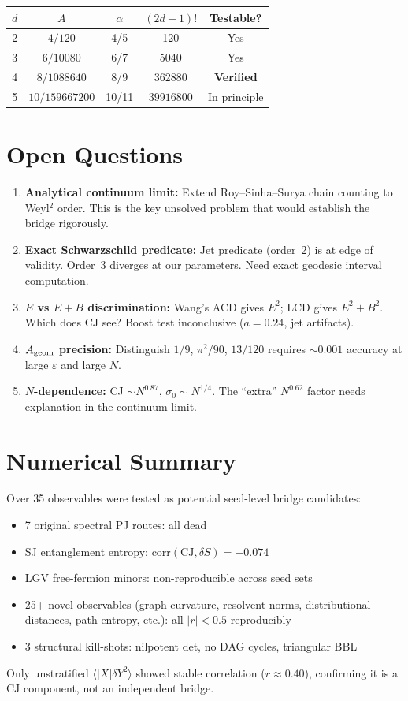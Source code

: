 \documentclass[11pt,a4paper]{article}
\begin{document}
\begin{center}
\begin{tabular}{ccccc}
\toprule
$d$ & $A$ & $\alpha$ & $(2d+1)!$ & Testable? \\
\midrule
2 & $4/120$ & 4/5 & 120 & Yes \\
3 & $6/10080$ & 6/7 & 5040 & Yes \\
4 & $8/1088640$ & 8/9 & 362880 & \textbf{Verified} \\
5 & $10/159667200$ & 10/11 & $39916800$ & In principle \\
\bottomrule
\end{tabular}
\end{center}

\section{Open Questions}

\begin{enumerate}
\item \textbf{Analytical continuum limit:} Extend Roy--Sinha--Surya chain counting to Weyl$^2$ order. This is the key unsolved problem that would establish the bridge rigorously.
\item \textbf{Exact Schwarzschild predicate:} Jet predicate (order~2) is at edge of validity. Order~3 diverges at our parameters. Need exact geodesic interval computation.
\item \textbf{$E$ vs $E+B$ discrimination:} Wang's ACD gives $E^2$; LCD gives $E^2+B^2$. Which does CJ see? Boost test inconclusive ($a = 0.24$, jet artifacts).
\item \textbf{$A_{\rm geom}$ precision:} Distinguish $1/9$, $\pi^2/90$, $13/120$ requires $\sim 0.001$ accuracy at large $\varepsilon$ and large $N$.
\item \textbf{$N$-dependence:} CJ $\sim N^{0.87}$, $\sigma_0 \sim N^{1/4}$. The ``extra'' $N^{0.62}$ factor needs explanation in the continuum limit.
\end{enumerate}

\section{Numerical Summary}

Over 35 observables were tested as potential seed-level bridge candidates:
\begin{itemize}
\item 7 original spectral PJ routes: all dead
\item SJ entanglement entropy: $\text{corr}(\text{CJ}, \delta S) = -0.074$
\item LGV free-fermion minors: non-reproducible across seed sets
\item 25+ novel observables (graph curvature, resolvent norms, distributional distances, path entropy, etc.): all $|r| < 0.5$ reproducibly
\item 3 structural kill-shots: nilpotent det, no DAG cycles, triangular BBL
\end{itemize}

Only unstratified $\langle|X|\delta Y^2\rangle$ showed stable correlation ($r \approx 0.40$), confirming it is a CJ component, not an independent bridge.
\end{document}
